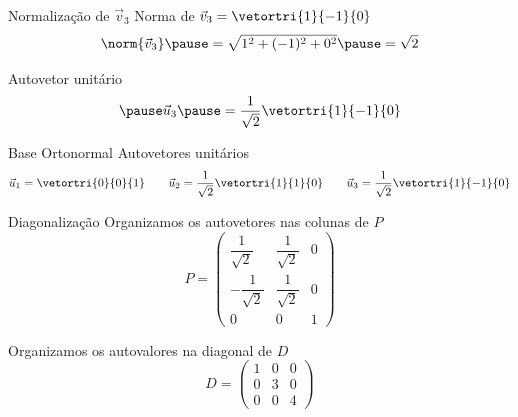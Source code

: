 \begin{resolution}{Normalização de $\vec{v}_3$}
  Norma de
  \(
    \vec{v}_3 = \vetortri{1}{-1}{0}
  \)
  \pause
  \[
    \norm{\vec{v}_{3}}
    \pause
    = \sqrt{1^2 +(-1)^2 + 0^2}
    \pause
    = \sqrt{2}
  \]

  \pause
  Autovetor unitário
  \[
    \pause
    \vec{u}_3
    \pause
    = \frac{1}{\sqrt{2}}
      \vetortri{1}{-1}{0}
  \]
\end{resolution}

\begin{resolution}{Base Ortonormal}
  Autovetores unitários
  \[
    \vec{u}_{1} = \vetortri{0}{0}{1}                     \qquad
    \vec{u}_{2} = \frac{1}{\sqrt{2}} \vetortri{1}{1}{0}  \qquad
    \vec{u}_{3} = \frac{1}{\sqrt{2}} \vetortri{1}{-1}{0}
  \]
\end{resolution}

\begin{resolution}{Diagonalização}
  Organizamos os autovetores nas colunas de $P$
  \[
    P =
    \begin{pmatrix}
      \dfrac{1}{\sqrt{2}}  & \dfrac{1}{\sqrt{2}} & 0 \\[0.3cm]
      -\dfrac{1}{\sqrt{2}} & \dfrac{1}{\sqrt{2}} & 0 \\[0.3cm]
      0                    & 0                   & 1
    \end{pmatrix}
  \]

  Organizamos os autovalores na diagonal de $D$
  \[
    D =
    \begin{pmatrix}
      1 & 0 & 0 \\
      0 & 3 & 0 \\
      0 & 0 & 4
    \end{pmatrix}
  \]
\end{resolution}

